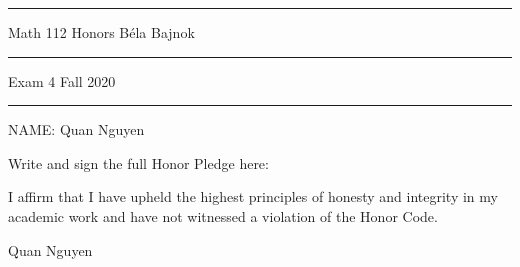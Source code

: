 \documentclass[12pt]{article}
\begin{document}
\hrule
\vspace{.2cm}

{\Large \noindent Math 112 Honors
\hfill
B\'ela Bajnok}

\vspace{.3cm}
\hrule

{\Large \noindent 
Exam 4
\hfill
Fall 2020}

\vspace{.3cm}
\hrule

\noindent NAME:  Quan Nguyen

\noindent \hrulefill\rule{0pt}{4pt}

\noindent Write and sign the full Honor Pledge here:

\vspace{2mm}

I affirm that I have upheld the highest principles of honesty and integrity in my academic work and have not witnessed a violation of the Honor Code. \par

Quan Nguyen

\vspace{8mm}

\noindent \hrulefill\rule{0pt}{4pt}

\end{document}
